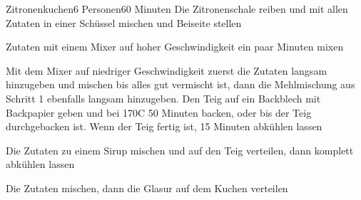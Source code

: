 \begin{recipe}{Zitronenkuchen}{6 Personen}{60 Minuten}
Die Zitronenschale reiben und mit allen Zutaten in einer Schüssel mischen und Beiseite stellen

Zutaten mit einem Mixer auf hoher Geschwindigkeit ein paar Minuten mixen

Mit dem Mixer auf niedriger Geschwindigkeit zuerst die Zutaten langsam hinzugeben und mischen bis alles gut vermischt ist, dann die Mehlmischung aus Schritt 1 ebenfalls langsam hinzugeben. Den Teig auf ein Backblech mit Backpapier geben und bei 170\0C 50 Minuten backen, oder bis der Teig durchgebacken ist. Wenn der Teig fertig ist, 15 Minuten abkühlen lassen

Die Zutaten zu einem Sirup mischen und auf den Teig verteilen, dann komplett abkühlen lassen

Die Zutaten mischen, dann die Glasur auf dem Kuchen verteilen
\end{recipe}

